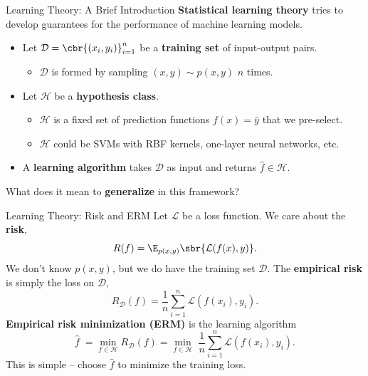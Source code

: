 \documentclass[notheorems]{beamer}
\begin{document}
    \begin{frame}{Learning Theory: A Brief Introduction}
        \textbf{Statistical learning theory} tries to develop guarantees for the performance of machine learning models.\vspace{0.5cm}\\
        \begin{itemize}
            \item Let $\mathcal{D} = \cbr{(x_i, y_i)}_{i=1}^n$ be a \textbf{training set} of input-output pairs.
                \begin{itemize}
                    \item $\mathcal{D}$ is formed by sampling $(x,y) \sim p(x,y)$ $n$ times.
                \end{itemize}
            \item Let $\mathcal{H}$ be a \textbf{hypothesis class}.
                \begin{itemize}
                    \item $\mathcal{H}$ is a fixed set of prediction functions $f(x) = \hat y$ that we pre-select.
                    \item $\mathcal{H}$ could be SVMs with RBF kernels, one-layer neural networks, etc.
                \end{itemize}
            \item A \textbf{learning algorithm} takes $\mathcal{D}$ as input and returns $\hat f \in \mathcal{H}$.
        \end{itemize}

        \vspace{0.5cm} What does it mean to \textbf{generalize} in this framework?

    \end{frame}

    \begin{frame}{Learning Theory: Risk and ERM}
        Let $\mathcal{L}$ be a loss function. We care about the \textbf{risk},
        \[ R(f) = \E_{p(x,y)} \sbr{\mathcal{L}(f(x), y)}. \]
        We don't know $p(x,y)$, but we do have the training set $\mathcal{D}$. The \textbf{empirical risk} is simply the loss on $\mathcal{D}$,
        \[ R_{\mathcal{D}}(f) = \frac{1}{n} \sum_{i=1}^n \mathcal{L}(f(x_i), y_i). \]
        \textbf{Empirical risk minimization (ERM)} is the learning algorithm
        \[ \hat f \; = \min_{f \in \mathcal{H}} R_{\mathcal{D}}(f) = \min_{f \in \mathcal{H}} \; \frac{1}{n} \sum_{i=1}^n \mathcal{L}(f(x_i), y_i). \]
        This is simple -- choose $\hat f$ to minimize the training loss.

    \end{frame}
\end{document}
